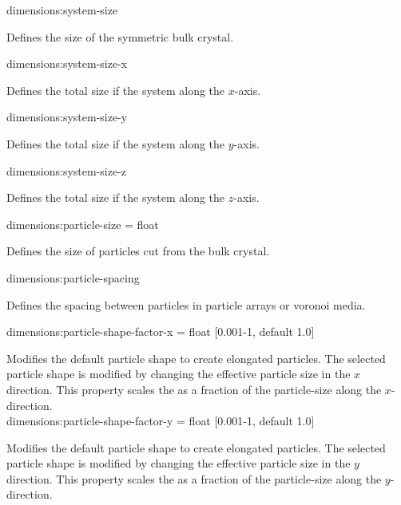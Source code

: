 {\zicf dimensions:system-size} Defines the size of the symmetric bulk crystal. \\ \par

{\zicf dimensions:system-size-x} Defines the total size if the system along the $x$-axis.\\ \par

{\zicf dimensions:system-size-y} Defines the total size if the system along the $y$-axis.\\ \par

{\zicf dimensions:system-size-z} Defines the total size if the system along the $z$-axis.\\ \par

{\zicf dimensions:particle-size = float} Defines the size of particles cut from the bulk crystal.\\ \par

{\zicf dimensions:particle-spacing} Defines the spacing between particles in particle arrays or voronoi media.\\ \par


{\zicf dimensions:particle-shape-factor-x = float [0.001-1, default 1.0]} Modifies the default particle shape to create elongated particles. The selected particle shape is modified by changing the effective particle size in the $x$ direction. This property scales the as a fraction of the particle-size along the $x$-direction.\\

{\zicf dimensions:particle-shape-factor-y = float [0.001-1, default 1.0]} Modifies the default particle shape to create elongated particles. The selected particle shape is modified by changing the effective particle size in the $y$ direction. This property scales the as a fraction of the particle-size along the $y$-direction.\\

